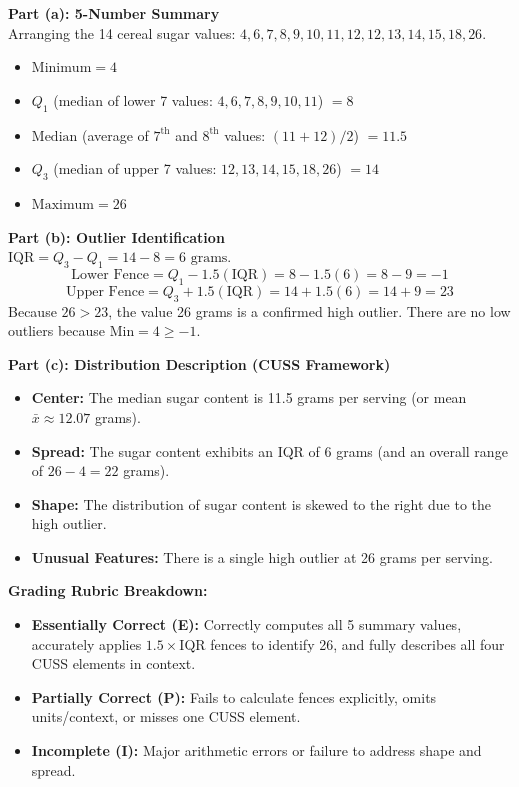 \begin{frqrubricbox}
\textbf{Part (a): 5-Number Summary}\\
Arranging the 14 cereal sugar values: $4, 6, 7, 8, 9, 10, 11, 12, 12, 13, 14, 15, 18, 26$.
\begin{itemize}
  \item $\text{Minimum} = 4$
  \item $Q_1$ (median of lower 7 values: $4, 6, 7, 8, 9, 10, 11$) $= 8$
  \item $\text{Median}$ (average of $7^{\text{th}}$ and $8^{\text{th}}$ values: $(11 + 12)/2$) $= 11.5$
  \item $Q_3$ (median of upper 7 values: $12, 13, 14, 15, 18, 26$) $= 14$
  \item $\text{Maximum} = 26$
\end{itemize}

\textbf{Part (b): Outlier Identification}\\
$\text{IQR} = Q_3 - Q_1 = 14 - 8 = 6\text{ grams}$.
\[ \text{Lower Fence} = Q_1 - 1.5(\text{IQR}) = 8 - 1.5(6) = 8 - 9 = -1 \]
\[ \text{Upper Fence} = Q_3 + 1.5(\text{IQR}) = 14 + 1.5(6) = 14 + 9 = 23 \]
Because $26 > 23$, the value 26 grams is a confirmed high outlier. There are no low outliers because $\text{Min} = 4 \ge -1$.

\textbf{Part (c): Distribution Description (CUSS Framework)}\\
\begin{itemize}
  \item \textbf{Center:} The median sugar content is 11.5 grams per serving (or mean $\bar{x} \approx 12.07$ grams).
  \item \textbf{Spread:} The sugar content exhibits an IQR of 6 grams (and an overall range of $26 - 4 = 22$ grams).
  \item \textbf{Shape:} The distribution of sugar content is skewed to the right due to the high outlier.
  \item \textbf{Unusual Features:} There is a single high outlier at 26 grams per serving.
\end{itemize}

\textbf{Grading Rubric Breakdown:}\\
\begin{itemize}
  \item \textbf{Essentially Correct (E):} Correctly computes all 5 summary values, accurately applies $1.5 \times \text{IQR}$ fences to identify 26, and fully describes all four CUSS elements in context.
  \item \textbf{Partially Correct (P):} Fails to calculate fences explicitly, omits units/context, or misses one CUSS element.
  \item \textbf{Incomplete (I):} Major arithmetic errors or failure to address shape and spread.
\end{itemize}
\end{frqrubricbox}

